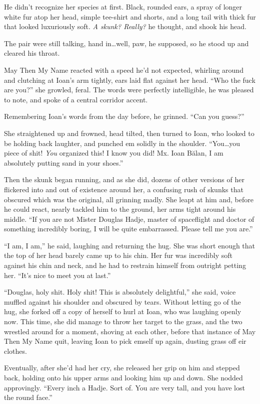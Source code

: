 He didn't recognize her species at first. Black, rounded ears, a spray of longer white fur atop her head, simple tee-shirt and shorts, and a long tail with thick fur that looked luxuriously soft. \emph{A skunk? Really?} he thought, and shook his head.

The pair were still talking, hand in\ldots well, paw, he supposed, so he stood up and cleared his throat.

May Then My Name reacted with a speed he'd not expected, whirling around and clutching at Ioan's arm tightly, ears laid flat against her head. ``Who the fuck are you?'' she growled, feral. The words were perfectly intelligible, he was pleased to note, and spoke of a central corridor accent.

Remembering Ioan's words from the day before, he grinned. ``Can you guess?''

She straightened up and frowned, head tilted, then turned to Ioan, who looked to be holding back laughter, and punched em solidly in the shoulder. ``You\ldots you piece of shit! \emph{You} organized this! I know you did! Mx. Ioan Bălan, I am absolutely putting sand in your shoes.''

Then the skunk began running, and as she did, dozens of other versions of her flickered into and out of existence around her, a confusing rush of skunks that obscured which was the original, all grinning madly. She leapt at him and, before he could react, nearly tackled him to the ground, her arms tight around his middle. ``If you are not Mister Douglas Hadje, master of spaceflight and doctor of something incredibly boring, I will be quite embarrassed. Please tell me you are.''

``I am, I am,'' he said, laughing and returning the hug. She was short enough that the top of her head barely came up to his chin. Her fur was incredibly soft against his chin and neck, and he had to restrain himself from outright petting her. ``It's nice to meet you at last.''

``Douglas, holy shit. Holy shit! This is absolutely delightful,'' she said, voice muffled against his shoulder and obscured by tears. Without letting go of the hug, she forked off a copy of herself to hurl at Ioan, who was laughing openly now. This time, she did manage to throw her target to the grass, and the two wrestled around for a moment, shoving at each other, before that instance of May Then My Name quit, leaving Ioan to pick emself up again, dusting grass off eir clothes.

Eventually, after she'd had her cry, she released her grip on him and stepped back, holding onto his upper arms and looking him up and down. She nodded approvingly. ``Every inch a Hadje. Sort of. You are very tall, and you have lost the round face.''

